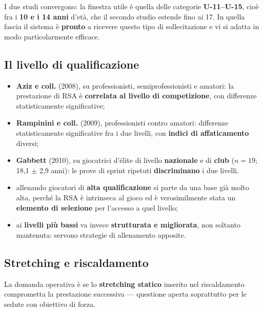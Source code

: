 I due studi convergono: la finestra utile è quella delle categorie \textbf{U-11--U-15}, cioè fra i
\textbf{10 e i 14 anni} d'età, che il secondo studio estende fino ai 17. In quella fascia il
sistema è \textbf{pronto} a ricevere questo tipo di sollecitazione e vi si adatta in modo
particolarmente efficace.

\subsection{Il livello di qualificazione}

\begin{itemize}
  \item \textbf{Aziz e coll.} (2008), su professionisti, semiprofessionisti e amatori: la
    prestazione di RSA è \textbf{correlata al livello di competizione}, con differenze
    statisticamente significative;
  \item \textbf{Rampinini e coll.} (2009), professionisti contro amatori: differenze
    statisticamente significative fra i due livelli, con \textbf{indici di affaticamento} diversi;
  \item \textbf{Gabbett} (2010), su giocatrici d'élite di livello \textbf{nazionale} e di
    \textbf{club} ($n = 19$; 18,1 $\pm$ 2,9 anni): le prove di sprint ripetuti
    \textbf{discriminano} i due livelli.
\end{itemize}

\begin{itemize}
  \item allenando giocatori di \textbf{alta qualificazione} si parte da una base già molto alta,
    perché la RSA è intrinseca al gioco ed è verosimilmente stata un \textbf{elemento di
    selezione} per l'accesso a quel livello;
  \item ai \textbf{livelli più bassi} va invece \textbf{strutturata e migliorata}, non soltanto
    mantenuta: servono strategie di allenamento apposite.
\end{itemize}

\subsection{Stretching e riscaldamento}

La domanda operativa è se lo \textbf{stretching statico} inserito nel riscaldamento comprometta la
prestazione successiva --- questione aperta soprattutto per le sedute con obiettivo di forza.

